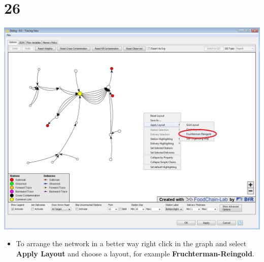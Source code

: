 \documentclass[10pt]{beamer}
\begin{document}
\section{26}
\begin{frame}
	\begin{center}
  		\includegraphics[height=0.6\textheight]{26.png}
	\end{center}
	\begin{itemize}
		\item To arrange the network in a better way right click in the graph and select \textbf{Apply Layout} and choose a layout, for example \textbf{Fruchterman-Reingold}.
	\end{itemize}
\end{frame}
\end{document}
